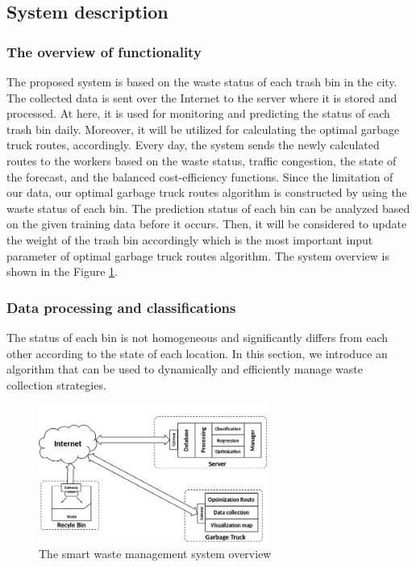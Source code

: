 \documentclass[conference]{IEEEtran}
\begin{document}
\subsection{System description}
\label{systemdesciption}
\subsubsection{The overview of functionality}


The proposed system is based on the waste status of each trash bin in the city. The collected data is sent over the Internet to the server where it is stored and processed. At here, it is used for monitoring and predicting the status of each trash bin daily. Moreover, it will be utilized for calculating the optimal garbage truck routes, accordingly.  Every day, the system sends the newly calculated routes to the workers based on the waste status, traffic congestion, the state of the forecast, and the balanced cost-efficiency functions. Since the limitation of our data, our optimal garbage truck routes algorithm is constructed by using the waste status of each bin. The prediction status of each bin can be analyzed based on the given training data before it occurs. Then, it will be considered to update the weight of the trash bin accordingly which is the most important input parameter of optimal garbage truck routes algorithm. The system overview is shown in the Figure \ref{fig2}.


\subsubsection{Data processing and classifications}


The status of each bin is not homogeneous and significantly differs from each other according to the state of each location. In this section, we introduce an algorithm that can be used to dynamically and efficiently manage waste collection strategies.
\begin{figure}
	\centering
	\includegraphics[width=7.5cm]{Model1-2}
	\caption{The smart waste management system overview}
	\label{fig2}
\end{figure}
\end{document}

